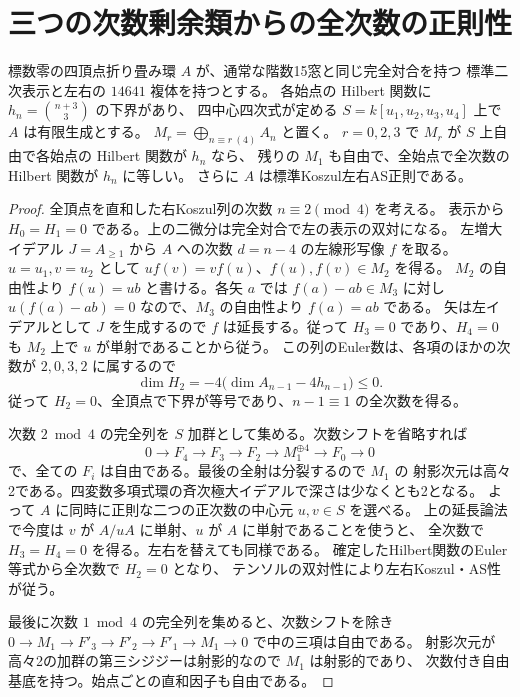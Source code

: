 \section{三つの次数剰余類からの全次数の正則性}
\label{sec:rank-fifteen-three-residue-classes}
\begin{lemma}\label{lem:rank-fifteen-three-residue-classes}
標数零の四頂点折り畳み環 $A$ が、通常な階数15窓と同じ完全対合を持つ
標準二次表示と左右の $14641$ 複体を持つとする。
各始点の Hilbert 関数に $h_n=\binom{n+3}{3}$ の下界があり、
四中心四次式が定める $S=k[u_1,u_2,u_3,u_4]$ 上で $A$ は有限生成とする。
$M_r=\bigoplus_{n\equiv r\ (4)} A_n$ と置く。
$r=0,2,3$ で $M_r$ が $S$ 上自由で各始点の Hilbert 関数が $h_n$ なら、
残りの $M_1$ も自由で、全始点で全次数の Hilbert 関数が $h_n$ に等しい。
さらに $A$ は標準Koszul左右AS正則である。
\end{lemma}
\begin{proof}
全頂点を直和した右Koszul列の次数 $n\equiv2\pmod4$ を考える。
表示から $H_0=H_1=0$ である。上の二微分は完全対合で左の表示の双対になる。
左増大イデアル $J=A_{\ge1}$ から $A$ への次数 $d=n-4$ の左線形写像 $f$ を取る。
$u=u_1,v=u_2$ として $u f(v)=v f(u)$、$f(u),f(v)\in M_2$ を得る。
$M_2$ の自由性より $f(u)=ub$ と書ける。各矢 $a$ では $f(a)-ab\in M_3$ に対し
$u(f(a)-ab)=0$ なので、$M_3$ の自由性より $f(a)=ab$ である。
矢は左イデアルとして $J$ を生成するので $f$ は延長する。従って
$H_3=0$ であり、$H_4=0$ も $M_2$ 上で $u$ が単射であることから従う。
この列のEuler数は、各項のほかの次数が $2,0,3,2$ に属するので
\[
        \dim H_2=-4\bigl(\dim A_{n-1}-4h_{n-1}\bigr)\le0 .
\]
従って $H_2=0$、全頂点で下界が等号であり、$n-1\equiv1$ の全次数を得る。

次数 $2\bmod4$ の完全列を $S$ 加群として集める。次数シフトを省略すれば
\[
 0\longrightarrow F_4\longrightarrow F_3\longrightarrow F_2
 \longrightarrow M_1^{\oplus4}\longrightarrow F_0\longrightarrow0
\]
で、全ての $F_i$ は自由である。最後の全射は分裂するので $M_1$ の
射影次元は高々2である。四変数多項式環の斉次極大イデアルで深さは少なくとも2となる。
よって $A$ に同時に正則な二つの正次数の中心元 $u,v\in S$ を選べる。
上の延長論法で今度は $v$ が $A/uA$ に単射、$u$ が $A$ に単射であることを使うと、
全次数で $H_3=H_4=0$ を得る。左右を替えても同様である。
確定したHilbert関数のEuler等式から全次数で $H_2=0$ となり、
テンソルの双対性により左右Koszul・AS性が従う。

最後に次数 $1\bmod4$ の完全列を集めると、次数シフトを除き
$0\to M_1\to F'_3\to F'_2\to F'_1\to M_1\to0$ で中の三項は自由である。
射影次元が高々2の加群の第三シジジーは射影的なので $M_1$ は射影的であり、
次数付き自由基底を持つ。始点ごとの直和因子も自由である。
\end{proof}
